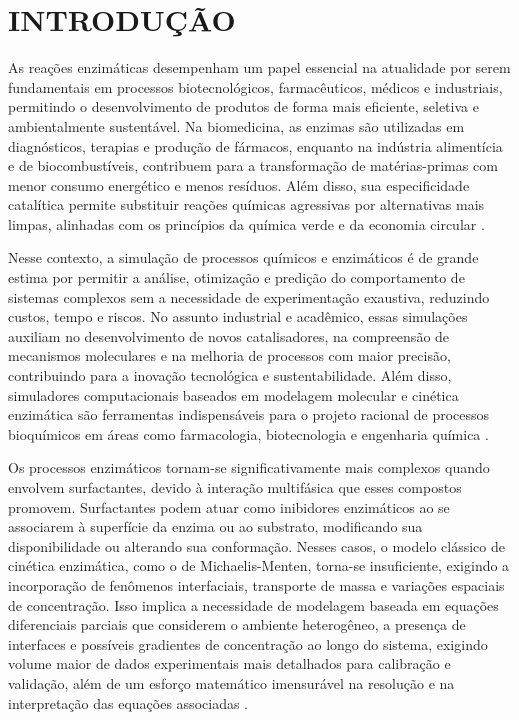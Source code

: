 \documentclass[12pt,oneside]{report}
\begin{document}
\tableofcontents
\newpage

\setcounter{page}{1}

\chapter{INTRODUÇÃO}

As reações enzimáticas desempenham um papel essencial na atualidade por serem fundamentais em processos biotecnológicos, farmacêuticos, médicos e industriais, permitindo o desenvolvimento de produtos de forma mais eficiente, seletiva e ambientalmente sustentável. Na biomedicina, as enzimas são utilizadas em diagnósticos, terapias e produção de fármacos, enquanto na indústria alimentícia e de biocombustíveis, contribuem para a transformação de matérias-primas com menor consumo energético e menos resíduos. Além disso, sua especificidade catalítica permite substituir reações químicas agressivas por alternativas mais limpas, alinhadas com os princípios da química verde e da economia circular \cite{nelson2018}.

Nesse contexto, a simulação de processos químicos e enzimáticos é de grande estima por permitir a análise, otimização e predição do comportamento de sistemas complexos sem a necessidade de experimentação exaustiva, reduzindo custos, tempo e riscos. No assunto industrial e acadêmico, essas simulações auxiliam no desenvolvimento de novos catalisadores, na compreensão de mecanismos moleculares e na melhoria de processos com maior precisão, contribuindo para a inovação tecnológica e sustentabilidade. Além disso, simuladores computacionais baseados em modelagem molecular e cinética enzimática são ferramentas indispensáveis para o projeto racional de processos bioquímicos em áreas como farmacologia, biotecnologia e engenharia química \cite{leach2001}.

Os processos enzimáticos tornam-se significativamente mais complexos quando envolvem surfactantes, devido à interação multifásica que esses compostos promovem. Surfactantes podem atuar como inibidores enzimáticos ao se associarem à superfície da enzima ou ao substrato, modificando sua disponibilidade ou alterando sua conformação. Nesses casos, o modelo clássico de cinética enzimática, como o de Michaelis-Menten, torna-se insuficiente, exigindo a incorporação de fenômenos interfaciais, transporte de massa e variações espaciais de concentração. Isso implica a necessidade de modelagem baseada em equações diferenciais parciais que considerem o ambiente heterogêneo, a presença de interfaces e possíveis gradientes de concentração ao longo do sistema, exigindo volume maior de dados experimentais mais detalhados para calibração e validação, além de um esforço matemático imensurável na resolução e na interpretação das equações associadas \cite{vandermeer2001}.
\end{document}
